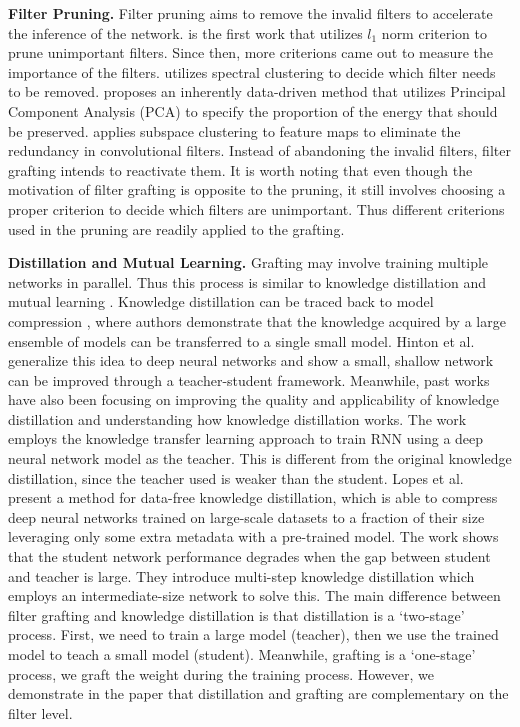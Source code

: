 \documentclass{article}
\begin{document}
\textbf{Filter Pruning.} 
Filter pruning \cite{han2015learning, han2015deep, guo2016dynamic, liu2017learning, lebedev2016fast, wen2016learning} aims to remove the invalid filters to accelerate the inference of the network. \cite{li2016pruning} is the first work that utilizes $l_{1}$ norm criterion to prune unimportant filters. Since then, more criterions came out to measure the importance of the filters. \cite{zhuo2018scsp} utilizes spectral clustering to decide which filter needs to be removed. \cite{suau2018principal} proposes an inherently data-driven method that utilizes Principal Component Analysis (PCA) to specify the proportion of the energy that should be preserved. \cite{wang2018exploring} applies subspace clustering to feature maps to eliminate the redundancy in convolutional filters. Instead of abandoning the invalid filters, filter grafting intends to reactivate them. It is worth noting that even though the motivation of filter grafting is opposite to the pruning, it still involves choosing a proper criterion to decide which filters are unimportant. Thus different criterions used in the pruning are readily applied to the grafting.



\textbf{Distillation and Mutual Learning.} Grafting may involve training multiple networks in parallel. Thus this process is similar to knowledge distillation \cite{hinton2015distilling} and mutual learning \cite{zhang2018deep}. 
Knowledge distillation can be traced back to model compression \cite{bucilua2006model}, where authors demonstrate that the knowledge acquired by a large ensemble of models can be transferred to a single small model. Hinton et al. \cite{hinton2015distilling} generalize this idea to deep neural networks and show a small, shallow network can be improved through a teacher-student framework. Meanwhile, past works have also been focusing on improving the quality and applicability of knowledge distillation and understanding how knowledge distillation works. The work \cite{tang2016recurrent} employs the knowledge transfer learning approach to train RNN using a deep neural network model as the teacher. This is different from the original knowledge distillation, since the teacher used is weaker than the student. 
Lopes et al. \cite{lopes2017data} present a method for data-free knowledge distillation, which is able to compress deep neural networks trained on large-scale datasets to a fraction of their size leveraging only some extra metadata with a pre-trained model. 
The work \cite{mirzadeh2019improved,cho2019efficacy} shows that the student network performance degrades when the gap between student and teacher is large. They introduce multi-step knowledge distillation which employs an intermediate-size network to solve this. 
The main difference between filter grafting and knowledge distillation is that distillation is a `two-stage' process. First, we need to train a large model (teacher), then we use the trained model to teach a small model (student). Meanwhile, grafting is a `one-stage' process, we graft the weight during the training process. However, we demonstrate in the paper that distillation 
and grafting are complementary on the filter level.
\end{document}
